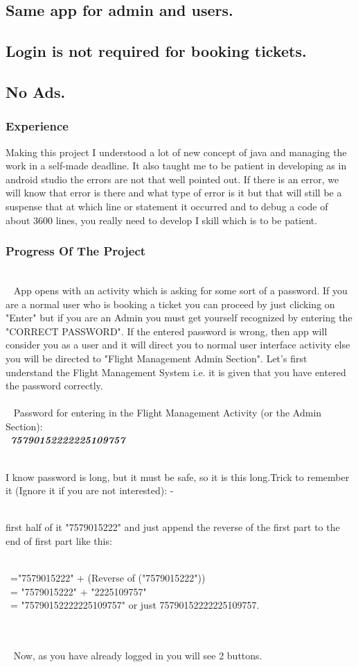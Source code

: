 \documentclass[8pt]{beamer}
\begin{document}
\subsection{Same app for admin and users.}
\subsection{Login is not required for booking tickets.}
\subsection{No Ads.} %

\begin{frame}
\frametitle{Experience}
Making this project I understood a lot of new concept of java and managing the work in a self-made deadline. It also taught me to be patient in developing as in android studio the errors are not that well pointed out. If there is an error, we will know that error is there and what type of error is it but that will still be a suspense that at which line or statement it occurred and to debug a code of about 3600 lines, you really need to develop I skill which is to be patient.
\end{frame}

\begin{frame}
\frametitle{Progress Of The Project}
\\~
App opens with an activity which is asking for some sort of a password. If you are a normal user who is booking a ticket you can proceed by just clicking on "Enter" but if you are an Admin you must get yourself recognized by entering the "CORRECT PASSWORD". If the entered password is wrong, then app will consider you as a user and it will direct you to normal user interface activity else you will be directed to "Flight Management Admin Section". Let's first understand the Flight Management System i.e. it is given that you have entered the password correctly.
\\~\\~
Password for entering in the Flight Management Activity (or the Admin Section): \\~\textbf{\textit{75790152222225109757}}
\\~

I know password is long, but it must be safe, so it is this long.Trick to remember it (Ignore it if you are not interested): -\\~

first half of it "7579015222" and just append the reverse of the first part to the end of first part like this:

\\~="7579015222" + (Reverse of ("7579015222"))
\\~= "7579015222" + "2225109757"
\\~= "75790152222225109757" or just 75790152222225109757.

\\~\\~
Now, as you have already logged in you will see 2 buttons.\end{frame}
\end{document}
